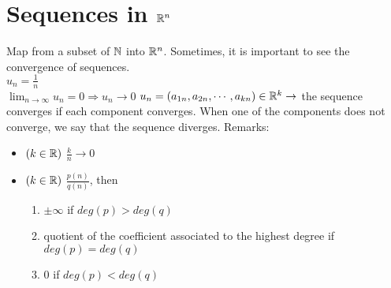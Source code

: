 \section{Sequences in $\mathbb{R}^n$}
Map from a subset of $\mathbb{N}$ into $\mathbb{R}^n$.
Sometimes, it is important to see the convergence of sequences.\\
$u_n = \frac{1}{n}$\\
$\lim_{n\to\infty} u_n = 0 \Rightarrow u_n\rightarrow0$
$u_n = (a_{1n}, a_{2n}, \cdots, a_{kn})\in\mathbb{R}^k\rightarrow$ the sequence converges if each component converges.
When one of the components does not converge, we say that the sequence diverges.
Remarks:
\begin{itemize}
    \item $(k\in\mathbb{R})$ $\frac{k}{n}\rightarrow 0$
    \item $(k\in\mathbb{R})$ $\frac{p(n)}{q(n)}$, then
        \begin{enumerate}
            \item $\pm\infty$ if $deg(p)>deg(q)$
            \item quotient of the coefficient associated to the highest degree if $deg(p)=deg(q)$
            \item 0 if $deg(p)<deg(q)$
        \end{enumerate}
\end{itemize}

